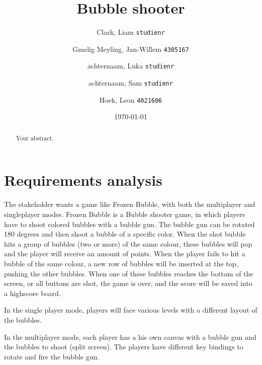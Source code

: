 \documentclass[a4paper]{article}
\title{Bubble shooter}
\author{
	Clark, Liam
    \texttt{studienr}
    \and
    Gmelig Meyling, Jan-Willem
    \texttt{4305167}
    \and
    achternaam, Luka
    \texttt{studienr}
    \and
    achternaam, Sam
    \texttt{studienr}
    \and
    Hoek, Leon
    \texttt{4021606}   
}
\date{\today}
\begin{document}
\maketitle

\begin{abstract}
Your abstract.
\end{abstract}


\section{Requirements analysis}
The stakeholder wants a game like Frozen Bubble, with both the multiplayer and singleplayer modes. Frozen Bubble is a Bubble shooter game, in which players have to shoot colored bubbles with a bubble gun. The bubble gun can be rotated 180 degrees and then shoot a bubble of a specific color. When the shot bubble hits a group of bubbles (two or more) of the same colour, these bubbles will pop and the player will receive an amount of points. When the player fails to hit a bubble of the same colour, a new row of bubbles will be inserted at the top, pushing the other bubbles. When one of these bubbles reaches the bottom of the screen, or all buttons are shot, the game is over, and the score will be saved into a highscore board.
\par In the single player mode, players will face various levels with a different layout of the bubbles.
\par In the multiplayer mode, each player has a his own canvas with a bubble gun and the bubbles to shoot (split screen). The players have different key bindings to rotate and fire the bubble gun.
\end{document}
